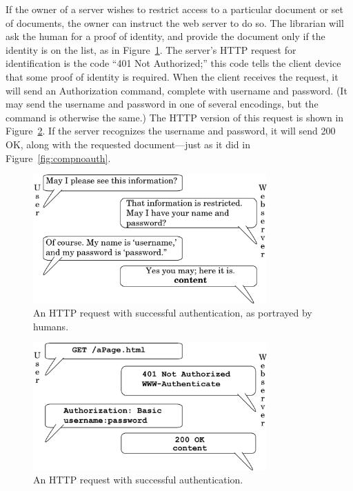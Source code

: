 \documentclass{article}
\begin{document}
	If the owner of a server wishes to restrict access to a particular document or set of documents, the owner can instruct the web server to do so. The librarian will ask the human for a proof of identity, and provide the document only if the identity is on the list, as in Figure~\ref{fig:humauthsuccess}. The server's HTTP request for identification is the code ``401 Not Authorized;'' this code tells the client device that some proof of identity is required. When the client receives the request, it will send an Authorization command, complete with username and password. (It may send the username and password in one of several encodings, but the command is otherwise the same.) The HTTP version of this request is shown in Figure~\ref{fig:compauthsuccess}. If the server recognizes the username and password, it will send 200 OK, along with the requested document---just as it did in Figure~\ref{fig:compnoauth}.
	
	\begin{figure}[ht!]
	  \centering
	  \includegraphics[width=0.8\textwidth]{diagrams/authsuccess2}
	  \caption{An HTTP request with successful authentication, as portrayed by humans.}
		\label{fig:humauthsuccess}
	\end{figure}
	
	\begin{figure}[ht!]
	  \centering
	  \includegraphics[width=0.8\textwidth]{diagrams/authsuccess2-2}
	  \caption{An HTTP request with successful authentication.}
		\label{fig:compauthsuccess}
	\end{figure}
	
\end{document}
